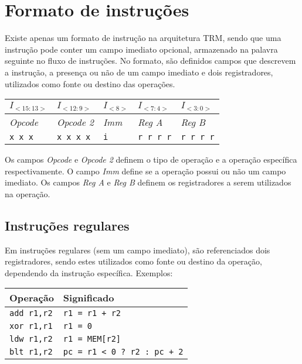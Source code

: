 \documentclass[11pt,a4paper]{report}
\begin{document}
\section{Formato de instruções}

Existe apenas um formato de instrução na arquitetura TRM, sendo que uma
instrução pode conter um campo imediato opcional, armazenado na palavra
seguinte no fluxo de instruções. No formato, são definidos campos que
descrevem a instrução, a presença ou não de um campo imediato e dois
registradores, utilizados como fonte ou destino das operações.

\begin{table}[htb!]
\centering
\begin{tabular}{|p{2cm}|p{2cm}|p{2cm}|p{2cm}|p{2cm}|}
\hline
$I_{<15:13>}$ & $I_{<12:9>}$ & $I_{<8>}$ & $I_{<7:4>}$ & $I_{<3:0>}$  \\ \hline
\textit{Opcode} & \textit{Opcode 2} & \textit{Imm} & \textit{Reg A} & \textit{Reg B} \\ \hline
\texttt{x x x} & \texttt{x x x x} & \texttt{i} & \texttt{r r r r} & \texttt{r r r r} \\ \hline
\end{tabular}
\end{table}

Os campos \textit{Opcode} e \textit{Opcode 2} definem o tipo de operação
e a operação específica respectivamente. O campo \textit{Imm} define se
a operação possui ou não um campo imediato. Os campos \textit{Reg A} e 
\textit{Reg B} definem os registradores a serem utilizados na operação.

\subsection{Instruções regulares}

Em instruções regulares (sem um campo imediato), são referenciados dois
registradores, sendo estes utilizados como fonte ou destino da operação,
dependendo da instrução específica. Exemplos:

\begin{table}[htb!]
\centering
\begin{tabular}{|p{5.0cm}|p{8.0cm}|}
\hline
\bf{Operação} & \bf{Significado} \\ \hline \hline
\texttt{add r1,r2} & \verb|r1 = r1 + r2| \\ \hline
\texttt{xor r1,r1} & \verb|r1 = 0| \\ \hline
\texttt{ldw r1,r2} & \verb|r1 = MEM[r2]| \\ \hline
\texttt{blt r1,r2} & \verb|pc = r1 < 0 ? r2 : pc + 2| \\ \hline
\end{tabular}
\end{table}
\end{document}
